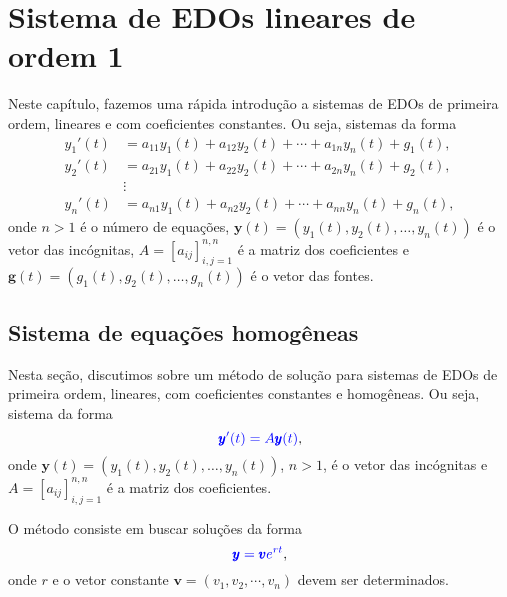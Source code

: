 
\chapter{Sistema de EDOs lineares de ordem 1}\label{cap_edosis1}

Neste capítulo, fazemos uma rápida introdução a sistemas de EDOs de primeira ordem, lineares e com coeficientes constantes. Ou seja, sistemas da forma
\begin{align}
  y_1'(t) &= a_{11}y_1(t) + a_{12}y_2(t) + \cdots + a_{1n}y_n(t) + g_1(t), \\
  y_2'(t) &= a_{21}y_1(t) + a_{22}y_2(t) + \cdots + a_{2n}y_n(t) + g_2(t), \\
  &\vdots \\
  y_n'(t) &= a_{n1}y_1(t) + a_{n2}y_2(t) + \cdots + a_{nn}y_n(t) + g_n(t),
\end{align}
onde $n>1$ é o número de equações, $\pmb{y}(t) = \left(y_1(t), y_2(t),\dotsc, y_n(t)\right)$ é o vetor das incógnitas, $A = [a_{ij}]_{i,j=1}^{n,n}$ é a matriz dos coeficientes e $\pmb{g}(t) = (g_1(t), g_2(t), \dotsc, g_n(t))$ é o vetor das fontes.

\section{Sistema de equações homogêneas}\label{cap_edosis1_sec_eqh}

Nesta seção, discutimos sobre um método de solução para sistemas de EDOs de primeira ordem, lineares, com coeficientes constantes e homogêneas. Ou seja, sistema da forma
\begin{equation}\label{eq:edosis1_eqh}
  {\color{blue}\pmb{y}'(t) = A\pmb{y}(t)},
\end{equation}
onde $\pmb{y}(t) = \left(y_1(t), y_2(t),\dotsc, y_n(t)\right)$, $n>1$, é o vetor das incógnitas e $A = [a_{ij}]_{i,j=1}^{n,n}$ é a matriz dos coeficientes.

O método consiste em buscar soluções da forma
\begin{equation}
  {\color{blue}\pmb{y} = \pmb{v}e^{rt}},
\end{equation}
onde $r$ e o vetor constante $\pmb{v} = (v_1, v_2, \cdots, v_n)$ devem ser determinados.

